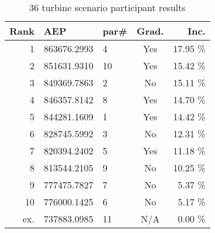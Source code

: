 		\begin{table}[H]
			\begin{center}
				\caption{36 turbine scenario participant results}
				\label{tab:results2}
				\begin{tabular}{r l l c r}
					\hline
					Rank           	& AEP         	& par\# & Grad.	& Inc.\\
					\hline
					1				& 863676.2993	& 4		& Yes   & 17.95 \%\\
					2				& 851631.9310	& 10	& Yes   & 15.42 \%\\
					3				& 849369.7863	& 2     & No    & 15.11 \%\\
					4				& 846357.8142	& 8     & Yes   & 14.70 \%\\
					5				& 844281.1609	& 1     & Yes   & 14.42 \%\\
					6				& 828745.5992	& 3     & No    & 12.31 \%\\
					7				& 820394.2402	& 5     & Yes	& 11.18 \%\\
					8				& 813544.2105	& 9     & No    & 10.25 \%\\
					9				& 777475.7827	& 7     & No    &  5.37 \%\\
					10				& 776000.1425	& 6     & No    &  5.17 \%\\
					ex.				& 737883.0985	& 11    & N/A	&  0.00 \%\\
					\hline
				\end{tabular}
			\end{center}
		\end{table}


